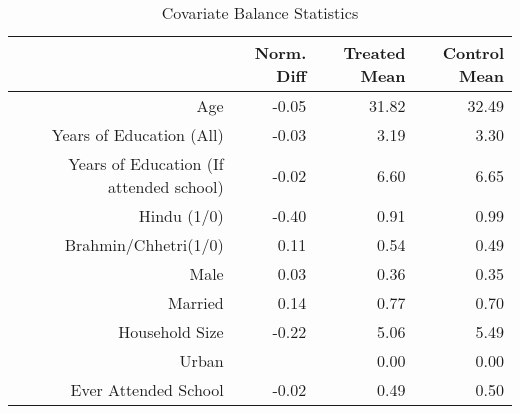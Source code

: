 \begin{table}[ht]
\centering
\begin{tabular}{rrrr}
  \toprule
 & Norm. Diff & Treated Mean & Control Mean \\ 
  \midrule
Age & -0.05 & 31.82 & 32.49 \\ 
  Years of Education (All) & -0.03 & 3.19 & 3.30 \\ 
  Years of Education (If attended school) & -0.02 & 6.60 & 6.65 \\ 
  Hindu (1/0) & -0.40 & 0.91 & 0.99 \\ 
  Brahmin/Chhetri(1/0) & 0.11 & 0.54 & 0.49 \\ 
  Male & 0.03 & 0.36 & 0.35 \\ 
  Married & 0.14 & 0.77 & 0.70 \\ 
  Household Size & -0.22 & 5.06 & 5.49 \\ 
  Urban &  & 0.00 & 0.00 \\ 
  Ever Attended School & -0.02 & 0.49 & 0.50 \\ 
   \bottomrule
\end{tabular}
\caption{Covariate Balance Statistics} 
\end{table}
